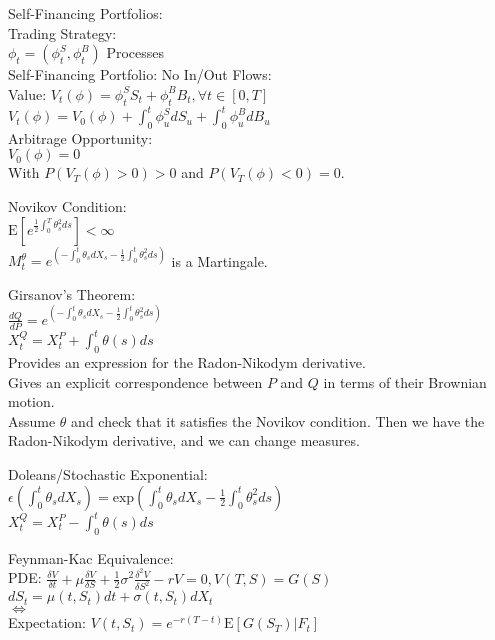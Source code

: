 Self-Financing Portfolios: \\
Trading Strategy: \\
$\phi_t = (\phi_t^S,\phi_t^B)$ Processes \\
Self-Financing Portfolio: No In/Out Flows: \\
Value: $V_t (\phi)=\phi_t^S S_t+\phi_t^B B_t, \forall t \in [0,T]$ \\
$V_t (\phi)=V_0 (\phi)+\int_0^t \phi_u^S dS_u + \int_0^t \phi_u^B dB_u$ \\
Arbitrage Opportunity: \\
$V_0 (\phi)=0$ \\
With $P(V_T (\phi)>0)>0$ and $P(V_T (\phi)<0)=0$.

Novikov Condition: \\
$\text{E}\left[ e^{\frac{1}{2} \int_0^T \theta_s^2 ds} \right] < \infty$ \\
$M_t^{\theta} = e^{(-\int_0^t \theta_s dX_s - \frac{1}{2} \int_0^t \theta_s^2 ds)}$ is a Martingale.

Girsanov's Theorem: \\
$\frac{dQ}{dP} = e^{(-\int_0^t \theta_s dX_s - \frac{1}{2} \int_0^t \theta_s^2 ds)}$ \\
$X_t^Q=X_t^P + \int_0^t \theta(s) ds$ \\
Provides an expression for the Radon-Nikodym derivative. \\
Gives an explicit correspondence between $P$ and $Q$ in terms of their Brownian motion. \\
Assume $\theta$ and check that it satisfies the Novikov condition. Then we have the Radon-Nikodym derivative, and we can change measures.

Doleans/Stochastic Exponential: \\
$\epsilon \left( \int_0^t \theta_s dX_s \right) = \text{exp}\left( \int_0^t \theta_s dX_s - \frac{1}{2}\int_0^t \theta_s^2 ds \right)$ \\
$X_t^Q = X_t^P - \int_0^t \theta(s)ds$

Feynman-Kac Equivalence: \\
PDE: $\frac{\delta V}{\delta t}+\mu \frac{\delta V}{\delta S} + \frac{1}{2} \sigma^2 \frac{\delta^2 V}{\delta S^2} -rV = 0 , V(T,S)=G(S)$ \\
$dS_t = \mu (t,S_t)dt+\sigma (t,S_t) dX_t$ \\
$\iff$ \\
Expectation: $V(t,S_t)=e^{-r(T-t)}\text{E}[G(S_T)|F_t]$

\newpage
\onecolumn

